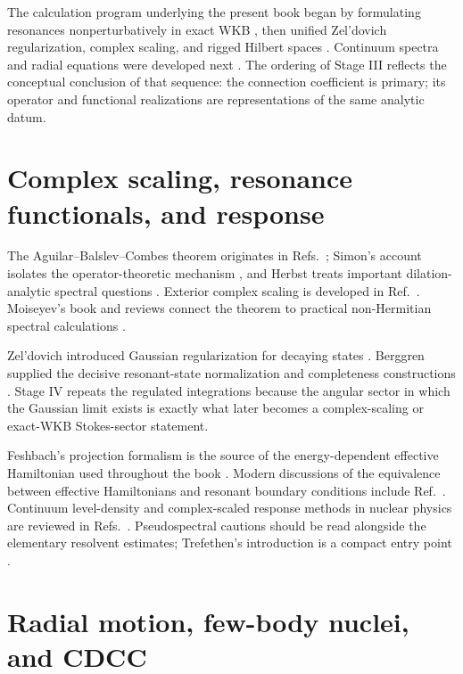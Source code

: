 The calculation program underlying the present book began by formulating
resonances nonperturbatively in exact WKB
\cite{MorikawaOgawa2025PTEP,Morikawa:2025vvs}, then unified Zel'dovich
regularization, complex scaling, and rigged Hilbert spaces
\cite{MorikawaOgawa2025JHEP,Morikawa:2025ezl}.  Continuum spectra and radial
equations were developed next
\cite{MorikawaOgawa2025Continuum,Morikawa:2025grx,Morikawa:2025inx}.  The
ordering of Stage III reflects the conceptual conclusion of that sequence:
the connection coefficient is primary; its operator and functional
realizations are representations of the same analytic datum.

\section*{Complex scaling, resonance functionals, and response}

The Aguilar--Balslev--Combes theorem originates in
Refs.~\cite{Aguilar:1971ve,Balslev:1971vb}; Simon's account isolates the
operator-theoretic mechanism \cite{Simon1972BalslevCombes}, and Herbst treats
important dilation-analytic spectral questions \cite{Herbst:1981ew}.
Exterior complex scaling is developed in Ref.~\cite{Simon1979ECS}.  Moiseyev's
book and reviews connect the theorem to practical non-Hermitian spectral
calculations \cite{Moiseyev:1998gjp,Moiseyev:2011,Moiseyev2011NHQM}.

Zel'dovich introduced Gaussian regularization for decaying states
\cite{Zel'dovich:1961}.  Berggren supplied the decisive resonant-state
normalization and completeness constructions
\cite{Berggren:1968zz,Berggren:1971,Berggren:1978,Berggren:1996}.  Stage IV
repeats the regulated integrations because the angular sector in which the
Gaussian limit exists is exactly what later becomes a complex-scaling or
exact-WKB Stokes-sector statement.

Feshbach's projection formalism is the source of the energy-dependent
effective Hamiltonian used throughout the book
\cite{Feshbach1958UnifiedI,Feshbach1962UnifiedII}.  Modern discussions of the
equivalence between effective Hamiltonians and resonant boundary conditions
include Ref.~\cite{Hatano2014Equivalence}.  Continuum level-density and
complex-scaled response methods in nuclear physics are reviewed in
Refs.~\cite{Myo:2014ypa,Myo:2023heu}.  Pseudospectral cautions should be read
alongside the elementary resolvent estimates; Trefethen's introduction is a
compact entry point \cite{Trefethen1999}.

\section*{Radial motion, few-body nuclei, and CDCC}

